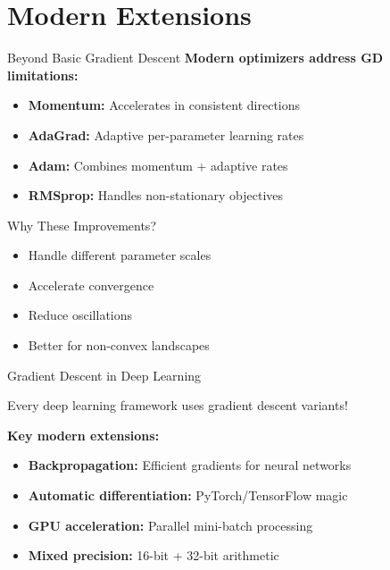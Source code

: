 \documentclass[usenames,dvipsnames]{beamer}
\begin{document}
  \section{Modern Extensions}

  \begin{frame}{Beyond Basic Gradient Descent}
    \textbf{Modern optimizers address GD limitations:}
    
    \begin{itemize}[<+->]
        \item \textbf{Momentum:} Accelerates in consistent directions
        \item \textbf{AdaGrad:} Adaptive per-parameter learning rates
        \item \textbf{Adam:} Combines momentum + adaptive rates
        \item \textbf{RMSprop:} Handles non-stationary objectives
    \end{itemize}
    
    \pause
    \begin{examplebox}{Why These Improvements?}
    \begin{itemize}
        \item Handle different parameter scales
        \item Accelerate convergence
        \item Reduce oscillations
        \item Better for non-convex landscapes
    \end{itemize}
    \end{examplebox}
  \end{frame}

  \begin{frame}{Gradient Descent in Deep Learning}
    \begin{keypointsbox}
    Every deep learning framework uses gradient descent variants!
    \end{keypointsbox}
    
    \pause
    \textbf{Key modern extensions:}
    \begin{itemize}[<+->]
        \item \textbf{Backpropagation:} Efficient gradients for neural networks
        \item \textbf{Automatic differentiation:} PyTorch/TensorFlow magic
        \item \textbf{GPU acceleration:} Parallel mini-batch processing
        \item \textbf{Mixed precision:} 16-bit + 32-bit arithmetic
    \end{itemize}
  \end{frame}
\end{document}
